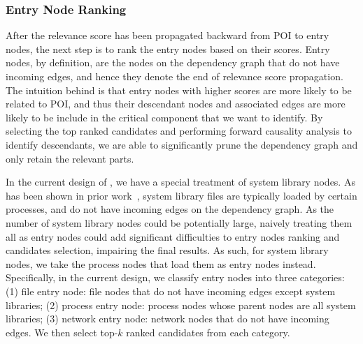 


\subsubsection{Entry Node Ranking}
\label{subsubsec:entry-ranking}
After the relevance score has been propagated backward from POI to entry nodes, the next step is to rank the entry nodes based on their scores.
Entry nodes, by definition, are the nodes on the dependency graph that do not have incoming edges, and hence they denote the end of relevance score propagation.
The intuition behind is that entry nodes with higher scores are more likely to be related to POI, and thus their descendant nodes and associated edges are more likely to be include in the critical component that we want to identify.
By selecting the top ranked candidates and performing forward causality analysis to identify descendants, we are able to significantly prune the dependency graph and only retain the relevant parts. 

In the current design of \tool, we have a special treatment of system library nodes. 
As has been shown in prior work~\cite{reduction2}, system library files are typically loaded by certain processes, and do not have incoming edges on the dependency graph.
As the number of system library nodes could be potentially large, naively treating them all as entry nodes could add significant difficulties to entry nodes ranking and candidates selection, impairing the final results.
As such, for system library nodes, we take the process nodes that load them as entry nodes instead.
%
Specifically, in the current design, we classify entry nodes into three categories: (1) file entry node: file nodes that do not have incoming edges except system libraries; (2) process entry node: process nodes whose parent nodes are all system libraries; (3) network entry node: network nodes that do not have incoming edges. 
We then select top-$k$ ranked candidates from each category.




